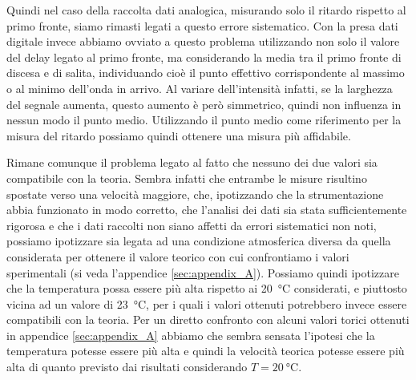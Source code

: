 \documentclass[
    prl,
    reprint, 
    superscriptaddress, 
    altaffilletter, 
    amsmath, 
    amssymb, 
    a4paper,
    varvw]{revtex4-2}
\begin{document}
Quindi nel caso della raccolta dati analogica, misurando solo il ritardo rispetto al primo fronte, siamo rimasti legati a questo errore sistematico. Con la presa dati digitale invece abbiamo ovviato a questo problema utilizzando non solo il valore del delay legato al primo fronte, ma considerando la media tra il primo fronte di discesa e di salita, individuando cioè il punto effettivo corrispondente al massimo o al minimo dell'onda in arrivo. Al variare dell'intensità infatti, se la larghezza del segnale aumenta, questo aumento è però simmetrico, quindi non influenza in nessun modo il punto medio. Utilizzando il punto medio come riferimento per la misura del ritardo possiamo quindi ottenere una misura più affidabile. 

Rimane comunque il problema legato al fatto che nessuno dei due valori sia compatibile con la teoria. Sembra infatti che entrambe le misure risultino spostate verso una velocità maggiore, che, ipotizzando che la strumentazione abbia funzionato in modo corretto, che l'analisi dei dati sia stata sufficientemente rigorosa e che i dati raccolti non siano affetti da errori sistematici non noti, possiamo ipotizzare sia legata ad una condizione atmosferica diversa da quella considerata per ottenere il valore teorico con cui confrontiamo i valori sperimentali (si veda l'appendice \ref{sec:appendix_A}). Possiamo quindi ipotizzare che la temperatura possa essere più alta rispetto ai \SI{20}{\celsius} considerati, e piuttosto vicina ad un valore di \SI{23}{\celsius}, per i quali i valori ottenuti potrebbero invece essere compatibili con la teoria. 
Per un diretto confronto con alcuni valori torici ottenuti in appendice \ref{sec:appendix_A} abbiamo che sembra sensata l'ipotesi che la temperatura potesse essere più alta e quindi la velocità teorica potesse essere più alta di quanto previsto dai risultati considerando $T=\SI{20}{\celsius}$. 
\end{document}
